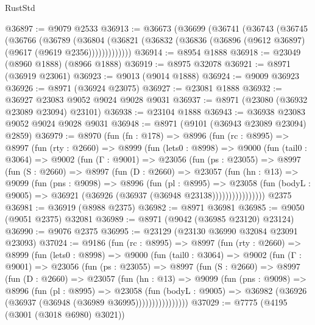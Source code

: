 \begin{lexlean}{RustStd}
\begin{coremodule}
@36897 := @9079 @2533
@36913 := @36673
    (@36699
      (@36741
        (@36743
          (@36745
            (@36766
              (@36789
                (@36804
                  (@36821 (@36832 (@36836 (@36896 (@9612 @36897) (@9617 (@9619 @2356)))))))))))))
@36914 := @8954 @1888
@36918 := @23049 (@8960 @1888) (@8966 @1888)
@36919 := @8975 @32078
@36921 := @8971 (@36919 @23061)
@36923 := @9013 (@9014 @1888)
@36924 := @9009 @36923
@36926 := @8971 (@36924 @23075)
@36927 := @23081 @1888
@36932 := @36927 @23083 @9052 @9024 @9028 @9031
@36937 := @8971 (@23080 (@36932 @23089 @23094) @23101)
@36938 := @23104 @1888
@36943 := @36938 @23083 @9052 @9024 @9028 @9031
@36948 := @8971 (@9101 (@36943 @23089 @23094) @2859)
@36979 := @8970
    (fun (fn : @178) =>
    @8996
      (fun (rc : @8995) =>
      @8997
        (fun (rty : @2660) =>
        @8999
          (fun (lets0 : @8998) =>
          @9000
            (fun (tail0 : @3064) =>
            @9002
              (fun (Γ : @9001) =>
              @23056
                (fun (ps : @23055) =>
                @8997
                  (fun (S : @2660) =>
                  @8997
                    (fun (D : @2660) =>
                    @23057
                      (fun (hn : @13) =>
                      @9099
                        (fun (pns : @9098) =>
                        @8996
                          (fun (pl : @8995) =>
                          @23058
                            (fun (bodyL : @9005) =>
                            @36921 (@36926 (@36937 (@36948 @23138))))))))))))))))
    @2375
@36981 := @36919 (@8988 @2375)
@36982 := @8971 @36981
@36985 := @9050 (@9051 @2375) @32081
@36989 := @8971 (@9042 (@36985 @23120) @23124)
@36990 := @9076 @2375
@36995 := @23129 (@23130 @36990 @32084 @23091 @23093)
@37024 := @9186
    (fun (rc : @8995) =>
    @8997
      (fun (rty : @2660) =>
      @8999
        (fun (lets0 : @8998) =>
        @9000
          (fun (tail0 : @3064) =>
          @9002
            (fun (Γ : @9001) =>
            @23056
              (fun (ps : @23055) =>
              @8997
                (fun (S : @2660) =>
                @8997
                  (fun (D : @2660) =>
                  @23057
                    (fun (hn : @13) =>
                    @9099
                      (fun (pns : @9098) =>
                      @8996
                        (fun (pl : @8995) =>
                        @23058
                          (fun (bodyL : @9005) =>
                          @36982 (@36926 (@36937 (@36948 (@36989 @36995))))))))))))))))
@37029 := @7775 (@4195 (@3001 (@3018 @6980) @3021))

\end{coremodule}
\end{lexlean}
